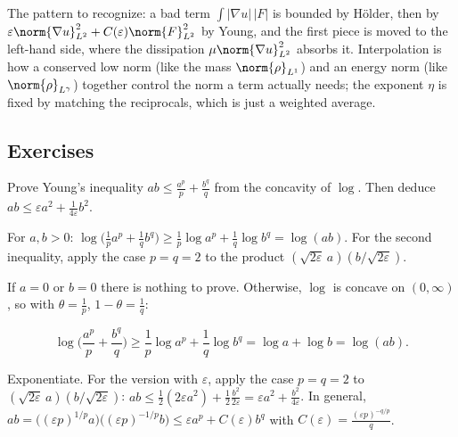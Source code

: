 The pattern to recognize: a bad term $\int |\nabla u|\,|F|$ is bounded by Hölder, then by $\varepsilon\norm{\nabla u}_{L^2}^2 + C(\varepsilon)\norm{F}_{L^2}^2$ by Young, and the first piece is moved to the left-hand side, where the dissipation $\mu\norm{\nabla u}_{L^2}^2$ absorbs it. Interpolation is how a conserved low norm (like the mass $\norm{\rho}_{L^1}$) and an energy norm (like $\norm{\rho}_{L^\gamma}$) together control the norm a term actually needs; the exponent $\eta$ is fixed by matching the reciprocals, which is just a weighted average.

\subsection*{Exercises}

\begin{exercise}
  Prove Young's inequality $ab \le \frac{a^p}{p} + \frac{b^q}{q}$ from the concavity of $\log$. Then deduce $ab \le \varepsilon a^2 + \frac{1}{4\varepsilon}b^2$.
  \begin{hint}
    For $a, b > 0$: $\log\big(\frac1p a^p + \frac1q b^q\big) \ge \frac1p\log a^p + \frac1q\log b^q = \log(ab)$. For the second inequality, apply the case $p = q = 2$ to the product $(\sqrt{2\varepsilon}\,a)(b/\sqrt{2\varepsilon})$.
  \end{hint}
  \begin{solution}
    If $a = 0$ or $b = 0$ there is nothing to prove. Otherwise, $\log$ is concave on $(0,\infty)$, so with $\theta = \frac1p$, $1 - \theta = \frac1q$:

    \[ \log\Big(\frac{a^p}{p} + \frac{b^q}{q}\Big) \ge \frac1p\log a^p + \frac1q\log b^q = \log a + \log b = \log(ab). \]

    Exponentiate. For the version with $\varepsilon$, apply the case $p = q = 2$ to $(\sqrt{2\varepsilon}\,a)(b/\sqrt{2\varepsilon})$: $ab \le \frac12(2\varepsilon a^2) + \frac12\frac{b^2}{2\varepsilon} = \varepsilon a^2 + \frac{b^2}{4\varepsilon}$. In general, $ab = \big((\varepsilon p)^{1/p}a\big)\big((\varepsilon p)^{-1/p}b\big) \le \varepsilon a^p + C(\varepsilon)b^q$ with $C(\varepsilon) = \frac{(\varepsilon p)^{-q/p}}{q}$.
  \end{solution}
\end{exercise}

